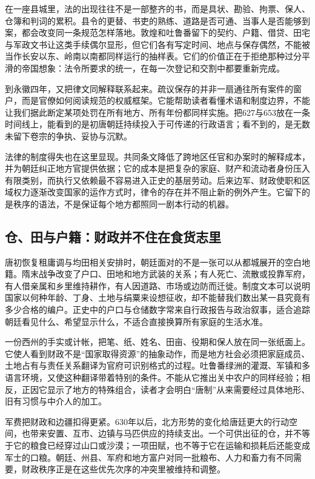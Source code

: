 在一座县城里，法的出现往往不是一部整齐的书，而是具状、勘验、拘票、保人、仓簿和判词的累积。县令的更替、书吏的熟练、道路是否可通、当事人是否能够到案，都会改变同一条规范怎样落地。敦煌和吐鲁番留下的契约、户籍、借贷、田宅与军政文书让这类手续偶尔显形，但它们各有写定时间、地点与保存偶然，不能被当作长安以东、岭南以南都同样运行的抽样表。它们的价值正在于拒绝那种过分平滑的帝国想象：法令所要求的统一，在每一次登记和交割中都要重新完成。

到永徽四年，又把律文同解释联系起来。疏议保存的并非一扇通往所有案件的窗户，而是官僚如何阅读规范的权威框架。它能帮助读者看懂术语和制度边界，不能让我们据此断定某项处罚在所有地方、所有年份都同样实施。把627与653放在一条时间线上，能看到的是初唐朝廷持续投入于可传递的行政语言；看不到的，是无数未留下卷宗的争执、妥协与沉默。

法律的制度得失也在这里显现。共同条文降低了跨地区任官和办案时的解释成本，并为朝廷纠正地方官提供依据；它的成本是把复杂的家庭、财产和流动者身份压入有限类别，而执行又依赖最不容易进入正史的基层劳动。后来边军、财政使职和区域权力逐渐改变国家的运作方式时，律令的存在并不阻止新的例外产生。它留下的是秩序的语法，不是保证每个地方都照同一剧本行动的机器。

\subsection{仓、田与户籍：财政并不住在食货志里}
唐初恢复租庸调与均田相关安排时，朝廷面对的不是一张可以从都城展开的空白地籍。隋末战争改变了户口、田地和地方武装的关系；有人死亡、流散或投靠军府，有人借亲属和乡里维持耕作，有人因道路、市场或边防而迁徙。制度文本可以说明国家以何种年龄、丁身、土地与绢粟来设想征收，却不能替我们数出某一县究竟有多少合格的编户。正史中的户口与仓储数字常来自行政报告与政治叙事，适合追踪朝廷看见什么、希望显示什么，不适合直接换算所有家庭的生活水准。

一份西州的手实或计帐，把笔、纸、姓名、田亩、役期和保人放在同一张纸面上。它使人看到财政不是“国家取得资源”的抽象动作，而是地方社会必须把家庭成员、土地占有与责任关系翻译为官府可识别格式的过程。吐鲁番绿洲的灌溉、军镇和多语言环境，又使这种翻译带着特别的条件。不能从它推出关中农户的同样经验；相反，正因它显示了地方的特殊组合，读者才会明白“唐制”从来需要经过具体地形、旧有习惯与中介人的加工。

军费把财政和边疆扣得更紧。630年以后，北方形势的变化给唐廷更大的行动空间，也带来安置、互市、边镇与马匹供应的持续支出。一个可供出征的仓，并不等于它的粮食已经穿过山口或沙漠；一项田赋，也不等于它在运输和损耗后还能变成军士的口粮。朝廷、州县、军府和地方富户对同一批粮布、人力和畜力有不同需要，财政秩序正是在这些优先次序的冲突里被维持和调整。

